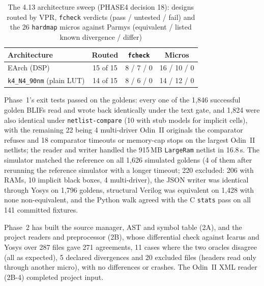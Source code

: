 \documentclass[conference]{IEEEtran}
\newcommand{\code}[1]{\texttt{#1}}
\begin{document}
\begin{table}[t]
\caption{The 4.13 architecture sweep (PHASE4 decision 18): designs routed by VPR, \code{fcheck}
verdicts (pass / untested / fail) and the 26 \code{hardmap} micros against Parmys (equivalent /
listed known divergence / differ)}
\label{tab:sweep}
\centering
\footnotesize
\begin{tabular}{@{}lccc@{}}
\toprule
Architecture & Routed & \code{fcheck} & Micros \\
\midrule
EArch (DSP) & 15 of 15 & 8 / 7 / 0 & 16 / 10 / 0 \\
\code{k4\_N4\_90nm} (plain LUT) & 14 of 15 & 8 / 6 / 0 & 14 / 12 / 0 \\
\bottomrule
\end{tabular}
\end{table}

Phase~1's exit tests passed on the goldens: every one of
the 1,846 successful golden BLIFs read and wrote back identically under the text gate, and 1,824
were also identical under \code{netlist-compare} (10 with stub models for implicit cells), with
the remaining 22 being 4 multi-driver Odin~II originals the comparator refuses and 18 comparator
timeouts or memory-cap stops on the largest Odin~II netlists; the reader and writer handled the
915\,MB \code{LargeRam} netlist in 16.8\,s. The simulator matched the reference on all 1,626
simulated goldens (4 of them after rerunning the reference simulator with a longer timeout;
220 excluded: 206 with RAMs, 10 implicit black boxes, 4 multi-driver), the
JSON writer was identical through Yosys on 1,796 goldens, structural Verilog was equivalent on
1,428 with none non-equivalent, and the Python walk agreed with the C \code{stats} pass on all 141
committed fixtures.

Phase~2 has built the source manager, AST and symbol table (2A), and the project readers and
preprocessor (2B), whose differential check against Icarus and Yosys over 287 files gave 271
agreements, 11 cases where the two oracles disagree (all as expected), 5 declared divergences and
20 excluded files (headers read only through another micro), with no differences or crashes. The
Odin~II XML reader (2B-4) completed project input.
\end{document}
